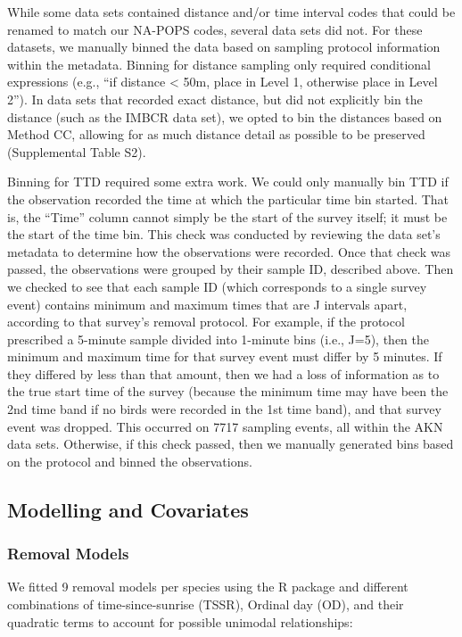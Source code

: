 While some data sets contained distance and/or time interval codes that could be renamed to match our NA-POPS codes, several data sets did not. For these datasets, we manually binned the data based on sampling protocol information within the metadata. Binning for distance sampling only required conditional expressions (e.g., “if distance < 50m, place in Level 1, otherwise place in Level 2”). In data sets that recorded exact distance, but did not explicitly bin the distance (such as the IMBCR data set), we opted to bin the distances based on Method CC, allowing for as much distance detail as possible to be preserved (Supplemental Table S2). 

Binning for TTD required some extra work. We could only manually bin TTD if the observation recorded the time at which the particular time bin started. That is, the “Time” column cannot simply be the start of the survey itself; it must be the start of the time bin. This check was conducted by reviewing the data set’s metadata to determine how the observations were recorded. Once that check was passed, the observations were grouped by their sample ID, described above. Then we checked to see that each sample ID (which corresponds to a single survey event) contains minimum and maximum times that are J intervals apart, according to that survey’s removal protocol. For example, if the protocol prescribed a 5-minute sample divided into 1-minute bins (i.e., J=5), then the minimum and maximum time for that survey event must differ by 5 minutes. If they differed by less than that amount, then we had a loss of information as to the true start time of the survey (because the minimum time may have been the 2nd time band if no birds were recorded in the 1st time band), and that survey event was dropped. This occurred on 7717 sampling events, all within the AKN data sets. Otherwise, if this check passed, then we manually generated bins based on the protocol and binned the observations.

\subsection{Modelling and Covariates}
\subsubsection{Removal Models}
We fitted 9 removal models \citep{farnsworth_removal_2002, alldredge_time--detection_2007} per species using the  R package \citep{solymos_detect_2020} and different combinations of time-since-sunrise (TSSR), Ordinal day (OD), and their quadratic terms to account for possible unimodal relationships:

